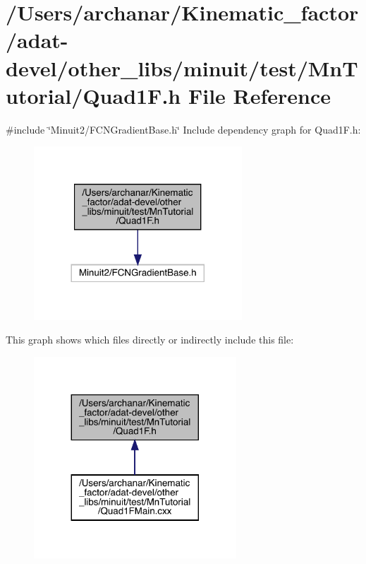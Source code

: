 \hypertarget{adat-devel_2other__libs_2minuit_2test_2MnTutorial_2Quad1F_8h}{}\section{/\+Users/archanar/\+Kinematic\+\_\+factor/adat-\/devel/other\+\_\+libs/minuit/test/\+Mn\+Tutorial/\+Quad1F.h File Reference}
\label{adat-devel_2other__libs_2minuit_2test_2MnTutorial_2Quad1F_8h}
{\ttfamily \#include \char`\"{}Minuit2/\+F\+C\+N\+Gradient\+Base.\+h\char`\"{}}\newline
Include dependency graph for Quad1\+F.\+h\+:
\nopagebreak
\begin{figure}[H]
\begin{center}
\leavevmode
\includegraphics[width=221pt]{d6/d41/adat-devel_2other__libs_2minuit_2test_2MnTutorial_2Quad1F_8h__incl}
\end{center}
\end{figure}
This graph shows which files directly or indirectly include this file\+:
\nopagebreak
\begin{figure}[H]
\begin{center}
\leavevmode
\includegraphics[width=215pt]{dd/de6/adat-devel_2other__libs_2minuit_2test_2MnTutorial_2Quad1F_8h__dep__incl}
\end{center}
\end{figure}
